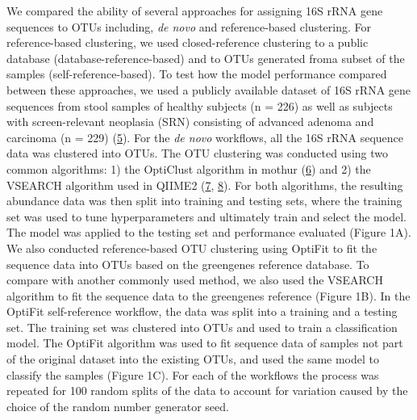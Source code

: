 \documentclass[
]{article}
\begin{document}
We compared the ability of several approaches for assigning 16S rRNA
gene sequences to OTUs including, \emph{de novo} and reference-based
clustering. For reference-based clustering, we used closed-reference
clustering to a public database (database-reference-based) and to OTUs
generated froma subset of the samples (self-reference-based). To test
how the model performance compared between these approaches, we used a
publicly available dataset of 16S rRNA gene sequences from stool samples
of healthy subjects (n = 226) as well as subjects with screen-relevant
neoplasia (SRN) consisting of advanced adenoma and carcinoma (n = 229)
(\protect\hyperlink{ref-baxter2016}{5}). For the \emph{de novo}
workflows, all the 16S rRNA sequence data was clustered into OTUs. The
OTU clustering was conducted using two common algorithms: 1) the
OptiClust algorithm in mothur (\protect\hyperlink{ref-westcott2017}{6})
and 2) the VSEARCH algorithm used in QIIME2
(\protect\hyperlink{ref-rognes2016}{7},
\protect\hyperlink{ref-bolyen2019}{8}). For both algorithms, the
resulting abundance data was then split into training and testing sets,
where the training set was used to tune hyperparameters and ultimately
train and select the model. The model was applied to the testing set and
performance evaluated (Figure 1A). We also conducted reference-based OTU
clustering using OptiFit to fit the sequence data into OTUs based on the
greengenes reference database. To compare with another commonly used
method, we also used the VSEARCH algorithm to fit the sequence data to
the greengenes reference (Figure 1B). In the OptiFit self-reference
workflow, the data was split into a training and a testing set. The
training set was clustered into OTUs and used to train a classification
model. The OptiFit algorithm was used to fit sequence data of samples
not part of the original dataset into the existing OTUs, and used the
same model to classify the samples (Figure 1C). For each of the
workflows the process was repeated for 100 random splits of the data to
account for variation caused by the choice of the random number
generator seed.
\end{document}
